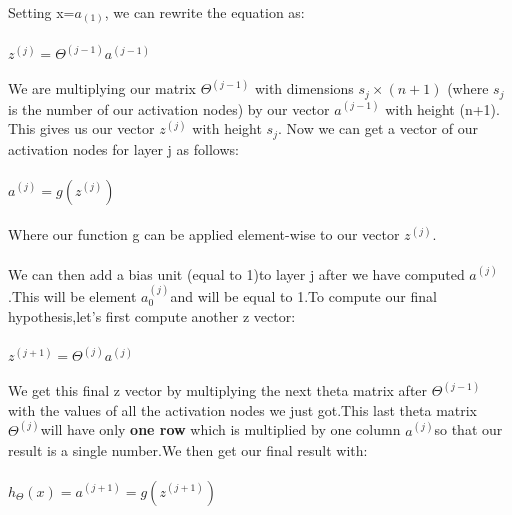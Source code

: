 \documentclass[UTF8]{ctexart}
\begin{document}
\paragraph{}
Setting x=$a_{(1)}$, we can rewrite the equation as:
\paragraph{}
\begin{algorithm}
$z^{(j)}=\Theta^{(j-1)} a^{(j-1)}$
\end{algorithm}
\paragraph{}
We are multiplying our matrix $\Theta^{(j-1)}$ with dimensions $s_{j}×(n+1)$ (where $s_{j}$ is the number of our activation nodes) by our vector $a^{(j−1)}$ with height (n+1). This gives us our vector $z^{(j)}$ with height $s_{j}$. Now we can get a vector of our activation nodes for layer j as follows:
\paragraph{}
$a^{(j)}=g(z^{(j)})$
\paragraph{}
Where our function g can be applied element-wise to our vector $z^{(j)}$.
\paragraph{}
We can then add a bias unit (equal to 1)to layer j after we have computed $a^{(j)}$.This will be element $a_{0}^{(j)}$and will be equal to 1.To compute our final hypothesis,let's first compute another z vector:
\paragraph{}
$z^{(j+1)}=\Theta^{(j)}a^{(j)}$
\paragraph{}
We get this final z vector by multiplying the next theta matrix after $\Theta^{(j-1)}$ with the values of all the activation nodes we just got.This last theta matrix $\Theta^{(j)}$will have only \textbf{one row} which is multiplied by one column $a^{(j)}$so that our result is a single number.We then get our final result with:
\paragraph{}
$h_{\Theta}(x)=a^{(j+1)}=g(z^{(j+1)})$
\end{document}
